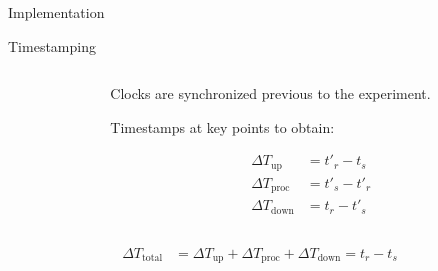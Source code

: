 \documentclass[aspectratio=1610]{beamer}
\begin{document}
\begin{frame}{Implementation}
    \begin{center}
        
    \end{center}
\end{frame}

\begin{frame}{Timestamping}
    \begin{columns}[onlytextwidth]
        \begin{column}{.5\linewidth}
            \footnotesize%
            \raggedright%
            
        \end{column}%
        \begin{column}{.5\linewidth}
            Clocks are synchronized previous to the experiment.

            \vspace{\baselineskip}%
            Timestamps at key points to obtain:

            \begin{align}
                {\Delta}T_\text{up} &= t'_{r} - t_{s}\\
                {\Delta}T_\text{proc} &= t'_{s} - t'_{r}\\
                {\Delta}T_\text{down} &= t_{r} - t'_{s}
            \end{align}
        \end{column}%
    \end{columns}
    \begin{align}
        {\Delta}T_\text{total} &= {\Delta}T_\text{up} + {\Delta}T_\text{proc} + {\Delta}T_\text{down} = t_{r} - t_{s}
    \end{align}
\end{frame}
\end{document}
